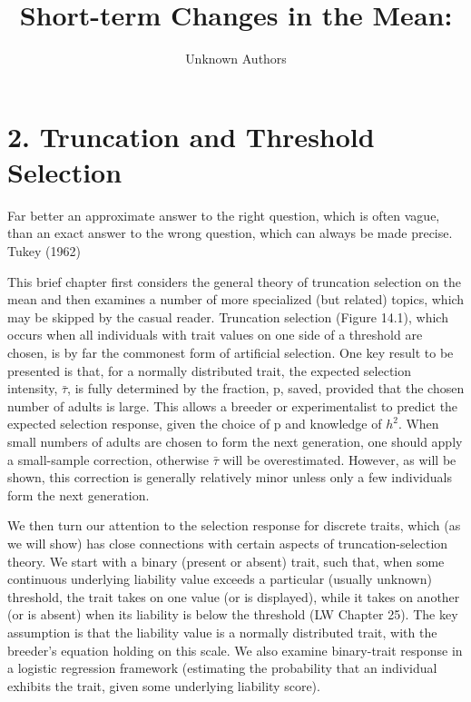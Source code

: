 \documentclass{article}
\title{Short-term Changes in the Mean:}
\author{Unknown Authors}
\date{}
\begin{document}
\maketitle

\begin{abstract}

\end{abstract}

\section{2. Truncation and Threshold Selection}
Far better an approximate answer to the right question, which is often vague, than an exact answer to the wrong question, which can always be made precise. Tukey (1962)

This brief chapter first considers the general theory of truncation selection on the mean and then examines a number of more specialized (but related) topics, which may be skipped by the casual reader. Truncation selection (Figure 14.1), which occurs when all individuals with trait values on one side of a threshold are chosen, is by far the commonest form of artificial selection. One key result to be presented is that, for a normally distributed trait, the expected selection intensity,  $ \bar{\tau} $, is fully determined by the fraction, p, saved, provided that the chosen number of adults is large. This allows a breeder or experimentalist to predict the expected selection response, given the choice of p and knowledge of  $ h^{2} $. When small numbers of adults are chosen to form the next generation, one should apply a small-sample correction, otherwise  $ \bar{\tau} $ will be overestimated. However, as will be shown, this correction is generally relatively minor unless only a few individuals form the next generation.

We then turn our attention to the selection response for discrete traits, which (as we will show) has close connections with certain aspects of truncation-selection theory. We start with a binary (present or absent) trait, such that, when some continuous underlying liability value exceeds a particular (usually unknown) threshold, the trait takes on one value (or is displayed), while it takes on another (or is absent) when its liability is below the threshold (LW Chapter 25). The key assumption is that the liability value is a normally distributed trait, with the breeder's equation holding on this scale. We also examine binary-trait response in a logistic regression framework (estimating the probability that an individual exhibits the trait, given some underlying liability score).
\end{document}
